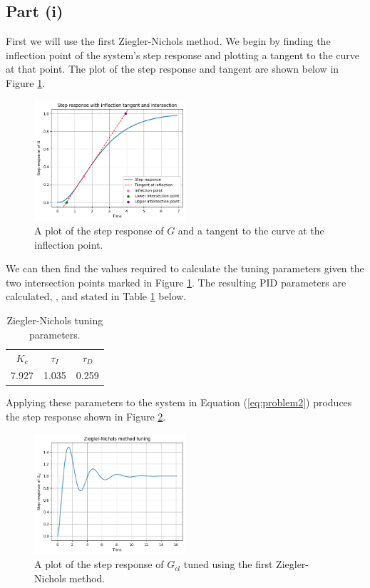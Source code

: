 \documentclass[10pt,a4paper]{article}
\begin{document}
    \subsection{Part (i)}
        First we will use the first Ziegler-Nichols method. We begin by finding the inflection point of the system's step response and plotting a tangent to the curve at that point. The plot of the step response and tangent are shown below in Figure \ref{fig:zn1_tangent}.
        \begin{figure}[h]
            \centering
            \includegraphics[width=0.5\textwidth]{zn1_stepRes+tangent.png}
            \caption{A plot of the step response of $G$ and a tangent to the curve at the inflection point.}
            \label{fig:zn1_tangent}
        \end{figure}
        We can then find the values required to calculate the tuning parameters given the two intersection points marked in Figure \ref{fig:zn1_tangent}. The resulting PID parameters are calculated, \cite[][Table 10.2]{sopaskis_2023_control}, and stated in Table \ref{tb:zn1_params} below.
        \begin{table}[h]
            \centering
            \begin{tabular}{ c | c | c }
                $K_c$ & $\tau_I$ & $\tau_D$ \\
                7.927 & 1.035    & 0.259
            \end{tabular}
            \caption{Ziegler-Nichols tuning parameters.}
            \label{tb:zn1_params}
        \end{table}
        Applying these parameters to the system in Equation (\ref{eq:problem2}) produces the step response shown in Figure \ref{fig:zn1_gcl}.
        \begin{figure}[h]
            \centering
            \includegraphics[width=0.5\textwidth]{zn1_Gcl.png}
            \caption{A plot of the step response of $G_{cl}$ tuned using the first Ziegler-Nichols method.}
            \label{fig:zn1_gcl}
        \end{figure}
\end{document}
